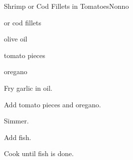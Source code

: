 \begin{recipe}{Shrimp or Cod Fillets in Tomatoes}{Nonno}{}

\begin{ingredients}
\item {} or cod fillets
\item olive oil
\item tomato pieces
\item oregano
\end{ingredients}

\begin{directions}
\item Fry garlic in oil.
\item Add tomato pieces and oregano.
\item Simmer.
\item Add fish.
\item Cook until fish is done.
\end{directions}

\end{recipe}
